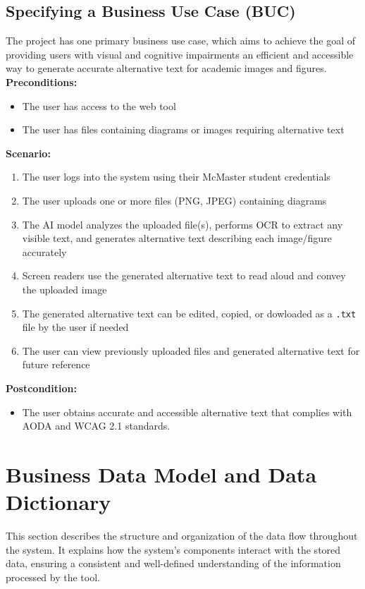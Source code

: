 \documentclass[12pt]{article}
\begin{document}
\subsection{Specifying a Business Use Case (BUC)}
The project has one primary business use case, which aims to achieve
the goal of providing users with visual and cognitive impairments an efficient
and accessible way to generate accurate alternative text for academic
images and figures.\\[1ex]
\textbf{Preconditions:}
\begin{itemize}
  \item The user has access to the web tool
  \item The user has files containing diagrams or images requiring
    alternative text
\end{itemize}
\textbf{Scenario:}
\begin{enumerate}
  \item The user logs into the system using their McMaster student credentials
  \item The user uploads one or more files (PNG, JPEG) containing diagrams
  \item The AI model analyzes the uploaded file(s), performs OCR to
    extract any visible text, and generates
    alternative text describing each image/figure accurately
  \item Screen readers use the generated alternative text to read
    aloud and convey the uploaded image
  \item The generated alternative text can be edited, copied, or
    dowloaded as a \texttt{.txt} file by the user if needed
  \item The user can view previously uploaded files and generated
    alternative text for future reference
\end{enumerate}
\textbf{Postcondition:}
\begin{itemize}
  \item The user obtains accurate and accessible alternative text
    that complies with AODA and WCAG 2.1 standards.
\end{itemize}

\section{Business Data Model and Data Dictionary}
This section describes the structure and organization of the data flow throughout the system. It explains how the system’s components interact with the stored data, ensuring a consistent and well-defined understanding of the information processed by the tool.
\end{document}
